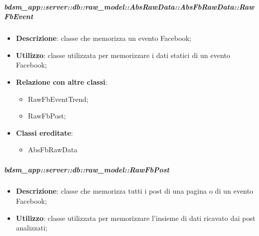      \subparagraph{bdsm\_app::server::db::raw\_model::AbsRawData::AbsFbRawData::RawFbEvent} %
    \label{subp:bdsm_app_server_raw_model_AbsRawData_AbsFbRawData_RawFbEvent}
      \begin{itemize}
        \item \textbf{Descrizione}: classe che memorizza un evento Facebook;
        \item \textbf{Utilizzo}: classe utilizzata per memorizzare i dati statici di un evento Facebook;
        \item \textbf{Relazione con altre classi}:
        \begin{itemize}
          \item RawFbEventTrend;
          \item RawFbPost;
        \end{itemize}
        \item \textbf{Classi ereditate}:
        \begin{itemize}
          \item AbsFbRawData
        \end{itemize}
      \end{itemize}
      \subparagraph{bdsm\_app::server::db::raw\_model::RawFbPost} %
    \label{subp:bdsm_app_server_raw_model_RawFbPost}
      \begin{itemize}
        \item \textbf{Descrizione}: classe che memorizza tutti i post di una pagina o di un evento Facebook;
        \item \textbf{Utilizzo}: classe utilizzata per memorizzare l'insieme di dati ricavato dai post analizzati;
      \end{itemize}



